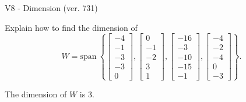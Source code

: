 \begin{exercise}
  \begin{exerciseTitle}V8 - Dimension (ver. 731)\end{exerciseTitle}
  \begin{exerciseStatement}
    Explain how to find the dimension of 
\[W=\mathrm{span}\ \left\{\left[\begin{array}{r}
-4 \\
-1 \\
-3 \\
-3 \\
0
\end{array}\right] , \left[\begin{array}{r}
0 \\
-1 \\
-2 \\
3 \\
1
\end{array}\right] , \left[\begin{array}{r}
-16 \\
-3 \\
-10 \\
-15 \\
-1
\end{array}\right] , \left[\begin{array}{r}
-4 \\
-2 \\
-4 \\
0 \\
-3
\end{array}\right]\right\}.\]



  \end{exerciseStatement}
  \begin{exerciseAnswer}
   The dimension of \(W\) is  \(3\).
  


  \end{exerciseAnswer}
\end{exercise}